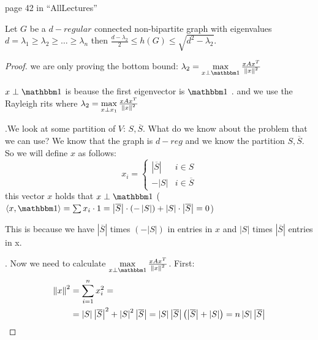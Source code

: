 \begin{thm}
\begin{insight}
page 42 in ``AllLectures''%
\end{insight}
Let $G$ be a $d-regular$ connected non-bipartite graph with eigenvalues
$d=\lambda_{1}\ge\lambda_{2}\ge\dots\ge\lambda_{n}$ then $\frac{d-\lambda_{2}}{2}\le h\left(G\right)\le\sqrt{d^{2}-\lambda_{2}}$.
\begin{proof}
we are only proving the bottom bound: $\lambda_{2}=\max\limits _{x\perp\one}\frac{xAx^{T}}{\norm x^{2}}$
\begin{insight}
$x\perp\one$ is beause the first eigenvector is $\one$ . and we
use the Rayleigh rits where $\lambda_{2}=\max\limits _{x\perp x_{1}}\frac{xAx^{T}}{\left\Vert x\right\Vert^{2}}$%
\end{insight}
.We look at some partition of $V$: $S,\overline{S}$. What do we
know about the problem that we can use? We know that the graph is
$d-reg$ and we know the partition $S,\overline{S}$. So we will define
$x$ as follows:
\[
x_{i}=\begin{cases}
\left|\overline{S}\right| & i\in S\\
-\left|S\right| & i\in\overline{S}
\end{cases}
\]
this vector $x$ holds that $x\perp\one$ ($\left\langle x,\one\right\rangle =\sum x_{i}\cdot1=\left|\overline{S}\right|\cdot\left(-\left|S\right|\right)+\left|S\right|\cdot\left|\overline{S}\right|=0$)%
\begin{insight}
This is because we have $\left|\overline{S}\right|$ times $\left(-\left|S\right|\right)$
in entries in $x$ and $\left|S\right|$ times $\left|\overline{S}\right|$
entries in x.%
\end{insight}
. Now we need to calculate $\max\limits _{x\perp\one}\frac{xAx^{T}}{\norm x^{2}}$.
First: 
\begin{align*}
\left\Vert x\right\Vert^{2} & =\sum_{i=1}^{n}x_{i}^{2}=\\
 & =\left|S\right|\left|\overline{S}\right|^{2}+\left|S\right|^{2}\left|\overline{S}\right|=\left|S\right|\left|\overline{S}\right|\left(\left|\overline{S}\right|+\left|S\right|\right)=n\left|S\right|\left|\overline{S}\right|
\end{align*}
 

\end{proof}
\end{thm}
